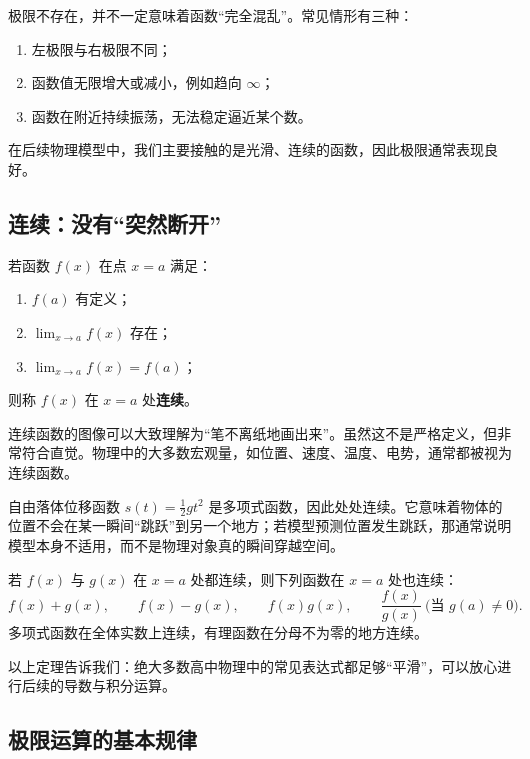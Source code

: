 \begin{remark}
极限不存在，并不一定意味着函数“完全混乱”。常见情形有三种：
\begin{enumerate}
  \item 左极限与右极限不同；
  \item 函数值无限增大或减小，例如趋向 $\infty$；
  \item 函数在附近持续振荡，无法稳定逼近某个数。
\end{enumerate}
在后续物理模型中，我们主要接触的是光滑、连续的函数，因此极限通常表现良好。
\end{remark}

\subsection{连续：没有“突然断开”}

\begin{definition}
若函数 $f(x)$ 在点 $x=a$ 满足：
\begin{enumerate}
  \item $f(a)$ 有定义；
  \item $\lim_{x\to a} f(x)$ 存在；
  \item $\lim_{x\to a} f(x)=f(a)$；
\end{enumerate}
则称 $f(x)$ 在 $x=a$ 处\textbf{连续}。
\end{definition}

连续函数的图像可以大致理解为“笔不离纸地画出来”。虽然这不是严格定义，但非常符合直觉。物理中的大多数宏观量，如位置、速度、温度、电势，通常都被视为连续函数。

\begin{example}
自由落体位移函数 $s(t)=\frac12 gt^2$ 是多项式函数，因此处处连续。它意味着物体的位置不会在某一瞬间“跳跃”到另一个地方；若模型预测位置发生跳跃，那通常说明模型本身不适用，而不是物理对象真的瞬间穿越空间。
\end{example}

\begin{theorem}
若 $f(x)$ 与 $g(x)$ 在 $x=a$ 处都连续，则下列函数在 $x=a$ 处也连续：
\[
  f(x)+g(x), \qquad f(x)-g(x), \qquad f(x)g(x), \qquad \frac{f(x)}{g(x)}\ \text{(当 } g(a)\ne 0\text{)}.
\]
多项式函数在全体实数上连续，有理函数在分母不为零的地方连续。
\end{theorem}

以上定理告诉我们：绝大多数高中物理中的常见表达式都足够“平滑”，可以放心进行后续的导数与积分运算。

\subsection{极限运算的基本规律}

